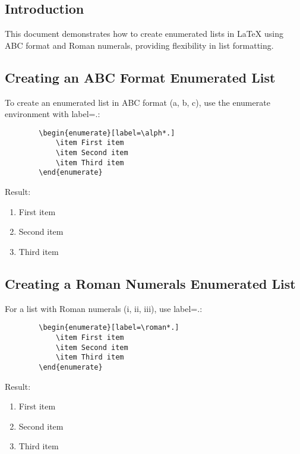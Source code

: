 \documentclass[12pt,a4paper]{article}
\begin{document}
	\subsection{Introduction}
	This document demonstrates how to create enumerated lists in LaTeX using ABC format and Roman numerals, providing flexibility in list formatting.
	
	\subsection{Creating an ABC Format Enumerated List}
	To create an enumerated list in ABC format (a, b, c), use the enumerate environment with label=\alph*.:
	
	\begin{verbatim}
		\begin{enumerate}[label=\alph*.]
			\item First item
			\item Second item
			\item Third item
		\end{enumerate}
	\end{verbatim}
	
	Result:
	
	\begin{enumerate}[label=\alph*.]
		\item First item
		\item Second item
		\item Third item
	\end{enumerate}
	
	\subsection{Creating a Roman Numerals Enumerated List}
	For a list with Roman numerals (i, ii, iii), use label=\roman*.:
	
	\begin{verbatim}
		\begin{enumerate}[label=\roman*.]
			\item First item
			\item Second item
			\item Third item
		\end{enumerate}
	\end{verbatim}
	
	Result:
	
	\begin{enumerate}[label=\roman*.]
		\item First item
		\item Second item
		\item Third item
	\end{enumerate}
    
\end{document}
